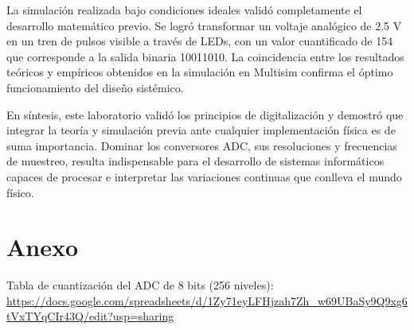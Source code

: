 \documentclass[12pt, a4paper]{article}
\begin{document}
    La simulación realizada bajo condiciones ideales validó completamente el desarrollo matemático previo. Se logró transformar un voltaje analógico de 2.5 V en un tren de pulsos visible a través de LEDs, con un valor cuantificado de 154 que corresponde a la salida binaria 10011010. La coincidencia entre los resultados teóricos y empíricos obtenidos en la simulación en Multisim confirma el óptimo funcionamiento del diseño sistémico.

    En síntesis, este laboratorio validó los principios de digitalización y demostró que integrar la teoría y simulación previa ante cualquier implementación física es de suma importancia. Dominar los conversores ADC, sus resoluciones y frecuencias de muestreo, resulta indispensable para el desarrollo de sistemas informáticos capaces de procesar e interpretar las variaciones continuas que conlleva el mundo físico. 

    \newpage
    \printbibliography
    \nocite{*}

    \section{Anexo}

    Tabla de cuantización del ADC de 8 bits (256 niveles):
    \\
    \footnotesize \url{https://docs.google.com/spreadsheets/d/1Zy71eyLFHjzah7Zh_w69UBaSy9Q9xg6tVxTYqCIr43Q/edit?usp=sharing}
\end{document}
